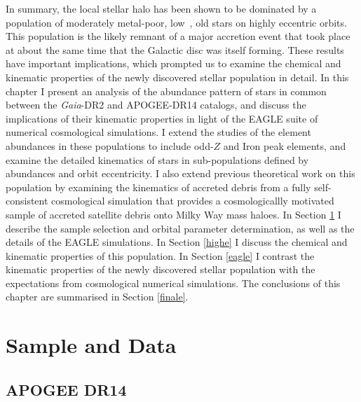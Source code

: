 In summary, the local stellar halo has been shown to be dominated
by a population of moderately metal-poor, low~\afe{}, old stars on
highly eccentric orbits.  This population is the likely remnant of
a major accretion event that took place at about the same time that
the Galactic disc was itself forming.  These results have important
implications, which prompted us to examine the chemical and kinematic
properties of the newly discovered stellar population in detail.
In this chapter I present an analysis of the
 abundance pattern of stars in common between the \emph{Gaia}-DR2
and APOGEE-DR14 catalogs, and discuss the implications of their
kinematic properties in light of the  EAGLE suite of numerical
cosmological simulations. I extend the studies of the element
abundances in these populations to include odd-$Z$ and Iron peak
elements, and examine the detailed kinematics of stars in sub-populations
defined by abundances and orbit eccentricity. I also extend previous
theoretical work on this population by examining the kinematics of
accreted debris from a fully self-consistent cosmological simulation
that provides a cosmologicallly motivated sample of accreted satellite
debris onto Milky Way mass haloes.  In Section \ref{data} I describe
the sample selection and orbital parameter determination, as well
as the details of the EAGLE simulations.  In Section \ref{highe}
I discuss the chemical and kinematic properties of this population.
In Section \ref{eagle} I contrast the kinematic properties of the
newly discovered stellar population with the expectations from
cosmological numerical simulations.  The conclusions of this chapter are summarised
in Section \ref{finale}.


\section{Sample and Data} \label{data}
\subsection{APOGEE DR14}

